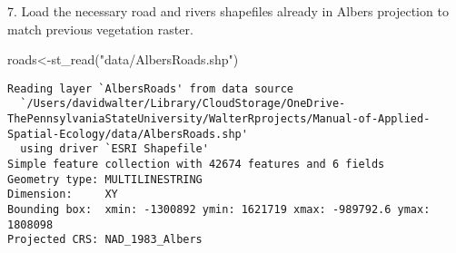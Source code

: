 \documentclass[
  letterpaper,
]{book}
\newenvironment{Shaded}{\begin{snugshade}}{\end{snugshade}}
\newcommand{\AttributeTok}[1]{\textcolor[rgb]{0.40,0.45,0.13}{#1}}
\newcommand{\CommentTok}[1]{\textcolor[rgb]{0.37,0.37,0.37}{#1}}
\newcommand{\DecValTok}[1]{\textcolor[rgb]{0.68,0.00,0.00}{#1}}
\newcommand{\FunctionTok}[1]{\textcolor[rgb]{0.28,0.35,0.67}{#1}}
\newcommand{\NormalTok}[1]{\textcolor[rgb]{0.00,0.23,0.31}{#1}}
\newcommand{\OtherTok}[1]{\textcolor[rgb]{0.00,0.23,0.31}{#1}}
\newcommand{\SpecialCharTok}[1]{\textcolor[rgb]{0.37,0.37,0.37}{#1}}
\newcommand{\StringTok}[1]{\textcolor[rgb]{0.13,0.47,0.30}{#1}}
\begin{document}
\begin{Shaded}
\end{Shaded}

7. Load the necessary road and rivers shapefiles already in Albers
projection to match previous vegetation raster.

\begin{Shaded}
\begin{Highlighting}[]
\NormalTok{roads}\OtherTok{\textless{}{-}}\FunctionTok{st\_read}\NormalTok{(}\StringTok{"data/AlbersRoads.shp"}\NormalTok{)}
\end{Highlighting}
\end{Shaded}

\begin{verbatim}
Reading layer `AlbersRoads' from data source 
  `/Users/davidwalter/Library/CloudStorage/OneDrive-ThePennsylvaniaStateUniversity/WalterRprojects/Manual-of-Applied-Spatial-Ecology/data/AlbersRoads.shp' 
  using driver `ESRI Shapefile'
Simple feature collection with 42674 features and 6 fields
Geometry type: MULTILINESTRING
Dimension:     XY
Bounding box:  xmin: -1300892 ymin: 1621719 xmax: -989792.6 ymax: 1808098
Projected CRS: NAD_1983_Albers
\end{verbatim}
\end{document}
